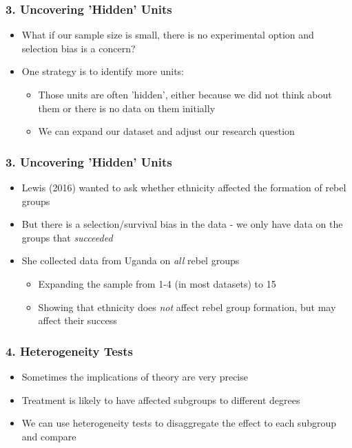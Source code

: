 \documentclass[xcolor=x11names,compress]{beamer}\usepackage[]{graphicx}\usepackage[]{xcolor}
\renewcommand{\(}{\begin{columns}}
\renewcommand{\)}{\end{columns}}
\newcommand{\<}[1]{\begin{column}{#1}}
\renewcommand{\>}{\end{column}}
\begin{document}
\begin{frame}
\frametitle{3. Uncovering 'Hidden' Units}
\begin{itemize}
\item What if our sample size is small, there is no experimental option and selection bias is a concern? 
\pause
\item One strategy is to identify more units:
\pause
\begin{itemize}
\item Those units are often 'hidden', either because we did not think about them or there is no data on them initially
\pause
\item We can expand our dataset and adjust our research question
\end{itemize}
\end{itemize}
\end{frame}

\begin{frame}
\frametitle{3. Uncovering 'Hidden' Units}
\begin{itemize}
\item Lewis (2016) wanted to ask whether ethnicity affected the formation of rebel groups
\pause
\item But there is a selection/survival bias in the data - we only have data on the groups that \textit{succeeded}
\pause
\item She collected data from Uganda on \textit{all} rebel groups
\pause
\begin{itemize}
\item Expanding the sample from 1-4 (in most datasets) to 15
\pause
\item Showing that ethnicity does \textit{not} affect rebel group formation, but may affect their success
\end{itemize}
\end{itemize}
\end{frame}



\begin{frame}
\frametitle{4. Heterogeneity Tests}
\begin{itemize}
\item Sometimes the implications of theory are very precise
\pause
\item Treatment is likely to have affected subgroups to different degrees
\pause
\item We can use heterogeneity tests to disaggregate the effect to each subgroup and compare
\end{itemize}
\end{frame}
\end{document}
